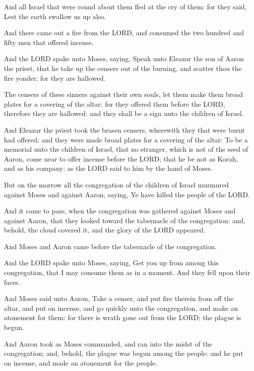 \Verse And all Israel that were round about them fled at the cry of
them: for they said, Lest the earth swallow us up also.

\Verse And there came out a fire from the LORD, and consumed the two
hundred and fifty men that offered incense.

\Verse And the LORD spake unto Moses, saying, \Verse Speak unto Eleazar
the son of Aaron the priest, that he take up the censers out of the
burning, and scatter thou the fire yonder; for they are hallowed.

\Verse The censers of these sinners against their own souls, let them
make them broad plates for a covering of the altar: for they offered
them before the LORD, therefore they are hallowed: and they shall be a
sign unto the children of Israel.

\Verse And Eleazar the priest took the brasen censers, wherewith they
that were burnt had offered; and they were made broad plates for a
covering of the altar: \Verse To be a memorial unto the children of
Israel, that no stranger, which is not of the seed of Aaron, come near
to offer incense before the LORD; that he be not as Korah, and as his
company: as the LORD said to him by the hand of Moses.

\Verse But on the morrow all the congregation of the children of Israel
murmured against Moses and against Aaron, saying, Ye have killed the
people of the LORD.

\Verse And it came to pass, when the congregation was gathered against
Moses and against Aaron, that they looked toward the tabernacle of the
congregation: and, behold, the cloud covered it, and the glory of the
LORD appeared.

\Verse And Moses and Aaron came before the tabernacle of the
congregation.

\Verse And the LORD spake unto Moses, saying, \Verse Get you up from
among this congregation, that I may consume them as in a moment. And
they fell upon their faces.

\Verse And Moses said unto Aaron, Take a censer, and put fire therein
from off the altar, and put on incense, and go quickly unto the
congregation, and make an atonement for them: for there is wrath gone
out from the LORD; the plague is begun.

\Verse And Aaron took as Moses commanded, and ran into the midst of the
congregation; and, behold, the plague was begun among the people: and
he put on incense, and made an atonement for the people.

